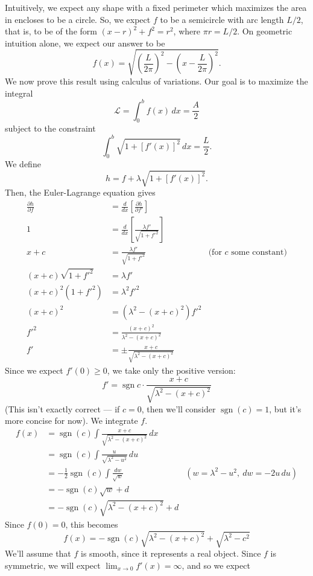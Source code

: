 \documentclass[10pt,letterpaper]{report}
\DeclareMathOperator{\sgn}{sgn}
\newcommand{\pp}[2]{\frac{\partial{#1}}{\partial{#2}}}
\begin{document}
\begin{enumerate}
Intuitively, we expect any shape with a fixed perimeter which maximizes the area in encloses to be a circle. So, we expect $f$ to be a semicircle with arc length $L/2$, that is, to be of the form $(x - r)^2 + f^2 = r^2$, where $\pi r = L/2$. On geometric intuition alone, we expect our answer to be
\[
f(x) = \sqrt{\left(\frac{L}{2\pi}\right)^2 - \left(x - \frac{L}{2\pi}\right)^2}.
\]
We now prove this result using calculus of variations. Our goal is to maximize the integral
\[
\mathcal{L} = \int_0^b f(x)\,dx = \frac{A}{2}
\]
subject to the constraint
\[
\int_0^b\sqrt{1 + \left[f'(x)\right]^2}\,dx = \frac{L}{2}.
\]
We define
\[
h = f + \lambda \sqrt{1 + \left[f'(x)\right]^2}.
\]
Then, the Euler-Lagrange equation gives
\begin{align*}
\pp{h}{f} &= \frac{d}{dx}\left[\pp{h}{f'}\right]
\\
1 &= \frac{d}{dx}\left[\frac{\lambda f'}{\sqrt{1 + f'^2}}\right]
\\
x + c &= \frac{\lambda f'}{\sqrt{1 + f'^2}} &\textrm{(for $c$ some constant)}
\\
(x + c)\sqrt{1 + f'^2} &= \lambda f'
\\
(x + c)^2\left(1 + f'^2\right) &= \lambda^2 f'^2
\\
(x+c)^2 &= \left(\lambda^2 - (x+c)^2\right)f'^2
\\
f'^2 &= \frac{(x+c)^2}{\lambda^2 - (x+c)^2}
\\
f' &= \pm \frac{x+c}{\sqrt{\lambda^2 - (x+c)^2}}
\end{align*}
Since we expect $f'(0) \geq 0$, we take only the positive version:
\[
f' = \sgn{c}\cdot \frac{x+c}{\sqrt{\lambda^2 - (x+c)^2}}
\]
(This isn't exactly correct --- if $c = 0$, then we'll consider $\sgn(c) = 1$, but it's more concise for now). We integrate $f$.
\begin{align*}
    f(x) &= \sgn(c) \int\frac{x+c}{\sqrt{\lambda^2 - (x+c)^2}}\,dx\\
    &=
    \sgn(c) \int \frac{u}{\sqrt{\lambda^2 - u^2}}\,du
    \\
    &=
    - \frac{1}{2}\sgn(c) \int \frac{dw}{\sqrt{w}} &\left(w = \lambda^2 - u^2,\ dw = -2u\,du\right)
    \\
    &=
    - \sgn(c)\sqrt{w} + d
    \\
    &=
    - \sgn(c)\sqrt{\lambda^2 - (x+c)^2} + d
\end{align*}
Since $f(0) = 0$, this becomes
\[
f(x) = -\sgn(c) \sqrt{\lambda^2 - (x+c)^2} + \sqrt{\lambda^2 - c^2}
\]
We'll assume that $f$ is smooth, since it represents a real object. Since $f$ is symmetric, we will expect $\lim_{x \to 0}f'(x) = \infty$, and so we expect

\end{enumerate}
\end{document}
